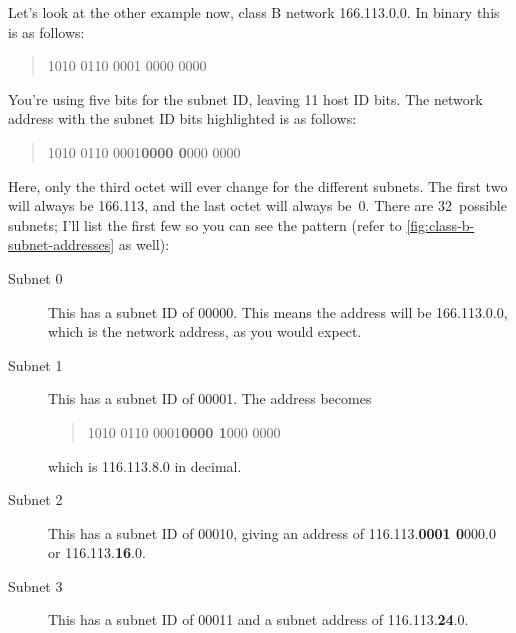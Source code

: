 Let's look at the other example now, class B network 166.113.0.0.
In binary this is as follows:
\begin{quote}
1010 0110 0001 0000 0000
\end{quote}

You're using five bits for the subnet ID, leaving 11 host ID bits.
The network address with the subnet ID bits highlighted is as follows:
\begin{quote}
1010 0110 0001\quad \textbf{0000 0}000 0000
\end{quote}

Here, only the third octet will ever change for the different subnets.
The first two will always be 166.113, and the last octet will always be~0.
There are 32~possible subnets; I'll list the first few so you can see the pattern (refer to \cref{fig:class-b-subnet-addresses} as well):

\begin{description}
   \item[Subnet 0]
      This has a subnet ID of 00000.
      This means the address will be 166.113.0.0, which is the network address, as you would expect.

   \item[Subnet 1]
      This has a subnet ID of 00001.
      The address becomes
      \begin{quote}
      1010 0110 0001\quad \textbf{0000 1}000 0000
      \end{quote}
      which is 116.113.8.0 in decimal.
      
   \item[Subnet 2]
      This has a subnet ID of 00010, giving an address of 116.113.\textbf{0001 0}000.0 or 116.113.\textbf{16}.0.

   \item[Subnet 3]
      This has a subnet ID of 00011 and a subnet address of 116.113.\textbf{24}.0.
\end{description}
 

